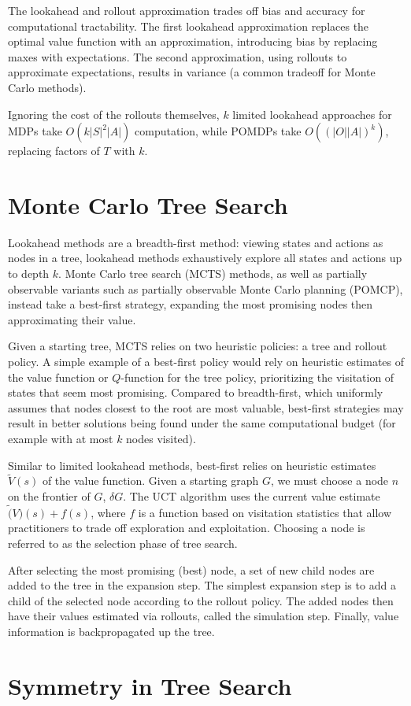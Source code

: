 \documentclass[11pt]{article}
\begin{document}
The lookahead and rollout approximation trades off bias and accuracy for computational
tractability.
The first lookahead approximation replaces the optimal value function with an approximation,
introducing bias by replacing maxes with expectations.
The second approximation, using rollouts to approximate expectations,
results in variance (a common tradeoff for Monte Carlo methods).

Ignoring the cost of the rollouts themselves, $k$ limited lookahead approaches for MDPs
take $O(k|S|^2|A|)$ computation, while POMDPs take $O((|O||A|)^k)$,
replacing factors of $T$ with $k$.

\section{Monte Carlo Tree Search}
Lookahead methods are a breadth-first method: viewing states and actions as nodes in a tree,
lookahead methods exhaustively explore all states and actions up to depth $k$.
Monte Carlo tree search (MCTS) methods, as well as
partially observable variants such as partially observable Monte Carlo planning (POMCP),
instead take a best-first strategy, expanding the most promising nodes
then approximating their value.

Given a starting tree, MCTS relies on two heuristic policies: a tree and rollout policy.
A simple example of a best-first policy would rely on heuristic estimates of the value function
or $Q$-function for the tree policy,
prioritizing the visitation of states that seem most promising.
Compared to breadth-first, which uniformly assumes that nodes closest to the root are most valuable,
best-first strategies may result in better solutions being found under the same
computational budget (for example with at most $k$ nodes visited).

Similar to limited lookahead methods, best-first relies on heuristic estimates
$\tilde{V}(s)$ of the value function.
Given a starting graph $G$, we must choose a node $n$ on the frontier of $G$, $\delta G$.
The UCT algorithm uses the current value estimate $\tilde(V)(s) + f(s)$,
where $f$ is a function based on visitation statistics that allow practitioners to trade off
exploration and exploitation.
Choosing a node is referred to as the selection phase of tree search.

After selecting the most promising (best) node,
a set of new child nodes are added to the tree in the expansion step.
The simplest expansion step is to add a child of the selected node according to the rollout policy.
The added nodes then have their values estimated via rollouts, called the simulation step.
Finally, value information is backpropagated up the tree.

\section{Symmetry in Tree Search}





\appendix
\end{document}

